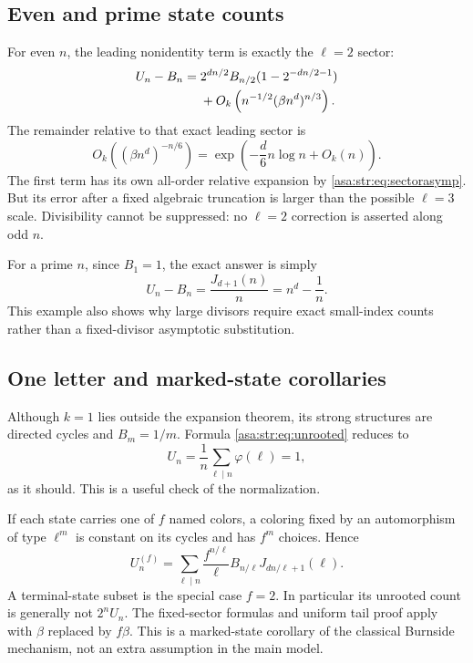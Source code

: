 \documentclass[11pt,letterpaper]{article}
\theoremstyle{remark}\newtheorem{remark}[theorem]{Remark}
\numberwithin{equation}{section}
\begin{document}
\subsection{Even and prime state counts}
For even $n$, the leading nonidentity term is exactly the $\ell=2$ sector:
\begin{align}
 U_n-B_n={}&2^{dn/2}B_{n/2}(1-2^{-dn/2-1})\notag\\
 &+O_k\left(n^{-1/2}(\beta n^d)^{n/3}\right).\label{asa:str:eq:even}
\end{align}
The remainder relative to that exact leading sector is
\[
 O_k((\beta n^d)^{-n/6})
 =\exp\left(-\frac d6n\log n+O_k(n)\right).
\]
The first term has its own all-order relative expansion by \eqref{asa:str:eq:sectorasymp}. But its error after a fixed algebraic truncation is larger than the possible $\ell=3$ scale. Divisibility cannot be suppressed: no $\ell=2$ correction is asserted along odd $n$.

For a prime $n$, since $B_1=1$, the exact answer is simply
\begin{equation}\label{asa:str:eq:prime}
 U_n-B_n=\frac{J_{d+1}(n)}n=n^d-\frac1n.
\end{equation}
This example also shows why large divisors require exact small-index counts rather than a fixed-divisor asymptotic substitution.

\subsection{One letter and marked-state corollaries}
Although $k=1$ lies outside the expansion theorem, its strong structures are directed cycles and $B_m=1/m$. Formula \eqref{asa:str:eq:unrooted} reduces to
\[
 U_n=\frac1n\sum_{\ell\mid n}\varphi(\ell)=1,
\]
as it should. This is a useful check of the normalization.

If each state carries one of $f$ named colors, a coloring fixed by an automorphism of type $\ell^m$ is constant on its cycles and has $f^m$ choices. Hence
\begin{equation}\label{asa:str:eq:colored}
 U_n^{(f)}=\sum_{\ell\mid n}\frac{f^{n/\ell}}\ell
 B_{n/\ell}J_{dn/\ell+1}(\ell).
\end{equation}
A terminal-state subset is the special case $f=2$. In particular its unrooted count is generally not $2^nU_n$. The fixed-sector formulas and uniform tail proof apply with $\beta$ replaced by $f\beta$. This is a marked-state corollary of the classical Burnside mechanism, not an extra assumption in the main model.
\end{document}
